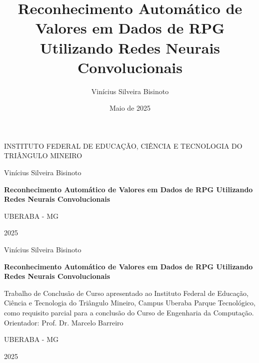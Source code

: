 \documentclass[12pt]{article}
\title{Reconhecimento Automático de Valores em Dados de RPG Utilizando Redes Neurais Convolucionais}
\author{Vinícius Silveira Bisinoto}
\date{Maio de 2025}
\begin{document}
\begin{titlepage}
    \centering
    {\scshape\Large INSTITUTO FEDERAL DE EDUCAÇÃO, CIÊNCIA E TECNOLOGIA DO TRIÂNGULO MINEIRO \par}
    \vfill
    {\Large Vinícius Silveira Bisinoto\par}
    \vfill
    {\bfseries\Large Reconhecimento Automático de Valores em Dados de RPG Utilizando Redes Neurais Convolucionais\par}
    \vfill
    {\large UBERABA - MG\par}
    {\large 2025\par}
\end{titlepage}

\begin{titlepage}
    \centering
    {\Large Vinícius Silveira Bisinoto\par}
    \vspace{1.5cm}
    {\bfseries\Large Reconhecimento Automático de Valores em Dados de RPG Utilizando Redes Neurais Convolucionais\par}
    \vfill
    \begin{flushright}
        \begin{minipage}{0.5\textwidth}
            Trabalho de Conclusão de Curso apresentado ao Instituto Federal de Educação, 
            Ciência e Tecnologia do Triângulo Mineiro, Campus Uberaba Parque Tecnológico, 
            como requisito parcial para a conclusão do Curso de Engenharia da Computação.\\
            Orientador: Prof. Dr. Marcelo Barreiro
        \end{minipage}
    \end{flushright}
    \vfill
    {\large UBERABA - MG\par}
    {\large2025\par}
\end{titlepage}

\listoffigures
\newpage
\tableofcontents
\newpage








\end{document}
